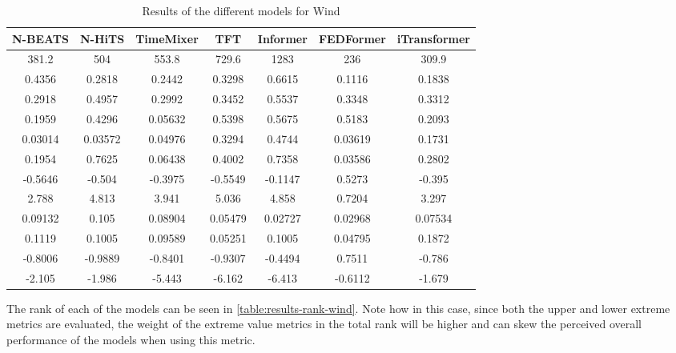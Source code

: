 \begin{table}[ht]
    \footnotesize
    \begin{flushright}
    \begin{tabular}[r]{|ccc|cccc}
        \toprule
        N-BEATS&N-HiTS&TimeMixer&TFT&Informer&FEDFormer&iTransformer  \\
        \midrule            
        381.2&504&553.8&729.6&1283&236&309.9 \\
        0.4356&0.2818&0.2442&0.3298&0.6615&0.1116&0.1838 \\
        0.2918&0.4957&0.2992&0.3452&0.5537&0.3348&0.3312 \\
        \midrule
        0.1959&0.4296&0.05632&0.5398&0.5675&0.5183&0.2093 \\
        0.03014&0.03572&0.04976&0.3294&0.4744&0.03619&0.1731 \\
        0.1954&0.7625&0.06438&0.4002&0.7358&0.03586&0.2802 \\
        \midrule
        -0.5646&-0.504&-0.3975&-0.5549&-0.1147&0.5273&-0.395 \\
        2.788&4.813&3.941&5.036&4.858&0.7204&3.297 \\
        0.09132&0.105&0.08904&0.05479&0.02727&0.02968&0.07534 \\
        0.1119&0.1005&0.09589&0.05251&0.1005&0.04795&0.1872 \\
        -0.8006&-0.9889&-0.8401&-0.9307&-0.4494&0.7511&-0.786 \\
        -2.105&-1.986&-5.443&-6.162&-6.413&-0.6112&-1.679 \\
        \bottomrule
    \end{tabular}
    \end{flushright}
    \caption{Results of the different models for Wind\label{long}}
    \label{table:results-wind}
\end{table}

The rank of each of the models can be seen in \autoref{table:results-rank-wind}. Note how in this case, since both the upper and lower extreme metrics are evaluated, the weight of the extreme value metrics in the total rank will be higher and can skew the perceived overall performance of the models when using this metric.

